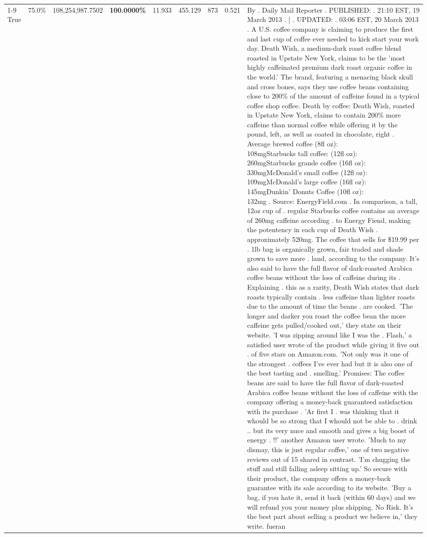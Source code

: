 \begin{table}[H]
{\begin{tabular}{lllrlllll}
\cline{1-9}
True & 75.0\% & 108,254,987.7502 & \bfseries \color{red} 100.0000\% & 11.933 & 455.129 & 873 & 0.521 & By . Daily Mail Reporter . PUBLISHED: . 21:10 EST, 19 March 2013 . | . UPDATED: . 03:06 EST, 20 March 2013 . A U.S. coffee company is claiming to produce the first and last cup of coffee ever needed to kick start your work day. Death Wish, a medium-dark roast coffee blend roasted in Upstate New York, claims to be the 'most highly caffeinated premium dark roast organic coffee in the world.' The brand, featuring a menacing black skull and cross bones, says they use coffee beans containing close to 200\% of the amount of caffeine found in a typical coffee shop coffee. Death by coffee: Death Wish, roasted in Upstate New York, claims to contain 200\% more caffeine than normal coffee while offering it by the pound, left, as well as coated in chocolate, right . Average brewed coffee (8fl oz):              108mgStarbucks tall coffee: (12fl oz):                260mgStarbucks grande coffee (16fl oz):         330mgMcDonald's small coffee (12fl oz):           109mgMcDonald's large coffee (16fl oz):           145mgDunkin' Donuts Coffee (10fl oz):             132mg . Source: EnergyField.com . In comparison, a tall, 12oz cup of . regular Starbucks coffee contains an average of 260mg caffeine according . to Energy Fiend, making the potentency in each cup of Death Wish . approximately 520mg. The coffee that sells for \$19.99 per . 1lb bag is organically grown, fair traded and shade grown to save more . land, according to the company. It's also said to have the full flavor of dark-roasted Arabica coffee beans without the loss of caffeine during its . Explaining . this as a rarity, Death Wish states that dark roasts typically contain . less caffeine than lighter roasts due to the amount of time the beans . are cooked. 'The longer and darker you roast the coffee bean the more caffeine gets pulled/cooked out,' they state on their website. 'I was zipping around like I was the . Flash,' a satisfied user wrote of the product while giving it five out . of five stars on Amazon.com. 'Not only was it one of the strongest . coffees I've ever had but it is also one of the best tasting and . smelling.’ Promises: The coffee beans are said to have the full flavor of dark-roasted Arabica coffee beans without the loss of caffeine with the company offering a money-back guaranteed satisfaction with its purchase . 'Ar first I . was thinking that it whould be so strong that I whould not be able to . drink .. but its very nuce and smooth and gives a big boost of energy . !!' another Amazon user wrote. 'Much to my dismay, this is just regular coffee,' one of two negative reviews out of 15 shared in contrast. 'I'm chugging the stuff and still falling asleep sitting up.' So secure with their product, the company offers a money-back guarantee with its sale according to its website. 'Buy a bag, if you hate it, send it back (within 60 days) and we will refund you your money plus shipping. No Risk. It’s the best part about selling a product we believe in,' they write. fueran \\

\end{tabular}}
\end{table}
